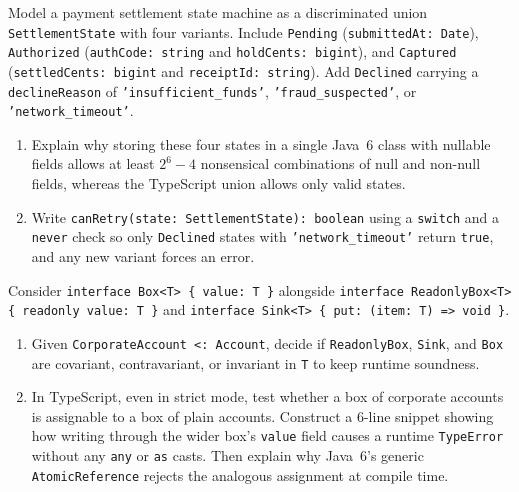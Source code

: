 \begin{exercise}
\label{ex:ch09-exhaustiveness}
Model a payment settlement state machine as a discriminated union \texttt{SettlementState} with four variants. Include \texttt{Pending} (\texttt{submittedAt: Date}), \texttt{Authorized} (\texttt{authCode: string} and \texttt{holdCents: bigint}), and \texttt{Captured} (\texttt{settledCents: bigint} and \texttt{receiptId: string}). Add \texttt{Declined} carrying a \texttt{declineReason} of \texttt{'insufficient\_funds'}, \texttt{'fraud\_suspected'}, or \texttt{'network\_timeout'}.
\begin{enumerate}
  \item Explain why storing these four states in a single Java~6 class with nullable fields allows at least $2^6 - 4$ nonsensical combinations of null and non-null fields, whereas the TypeScript union allows only valid states.
  \item Write \texttt{canRetry(state: SettlementState): boolean} using a \texttt{switch} and a \texttt{never} check so only \texttt{Declined} states with \texttt{'network\_timeout'} return \texttt{true}, and any new variant forces an error.
\end{enumerate}
\end{exercise}

\begin{exercise}
\label{ex:ch09-variance-trap}
Consider \texttt{interface Box<T> \{ value: T \}} alongside \texttt{interface ReadonlyBox<T> \{ readonly value: T \}} and \texttt{interface Sink<T> \{ put: (item: T) => void \}}.
\begin{enumerate}
  \item Given \texttt{CorporateAccount <: Account}, decide if \texttt{ReadonlyBox}, \texttt{Sink}, and \texttt{Box} are covariant, contravariant, or invariant in \texttt{T} to keep runtime soundness.
  \item In TypeScript, even in strict mode, test whether a box of corporate accounts is assignable to a box of plain accounts. Construct a 6-line snippet showing how writing through the wider box's \texttt{value} field causes a runtime \texttt{TypeError} without any \texttt{any} or \texttt{as} casts. Then explain why Java~6's generic \texttt{AtomicReference} rejects the analogous assignment at compile time.
\end{enumerate}
\end{exercise}

